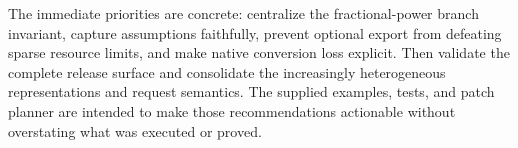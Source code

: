 The immediate priorities are concrete: centralize the fractional-power branch invariant, capture assumptions faithfully, prevent optional export from defeating sparse resource limits, and make native conversion loss explicit. Then validate the complete release surface and consolidate the increasingly heterogeneous representations and request semantics. The supplied examples, tests, and patch planner are intended to make those recommendations actionable without overstating what was executed or proved.
